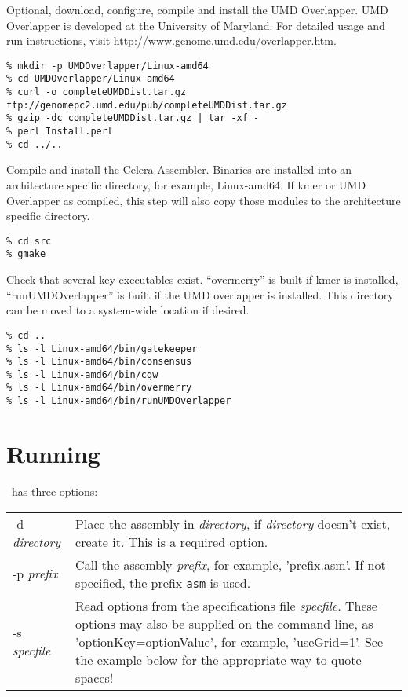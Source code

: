 \documentclass[twoside,11pt]{article}
\begin{document}
Optional, download, configure, compile and install the UMD Overlapper.  UMD Overlapper is developed at the University of Maryland. For detailed usage and run instructions, visit http://www.genome.umd.edu/overlapper.htm.

\begin{verbatim}
% mkdir -p UMDOverlapper/Linux-amd64
% cd UMDOverlapper/Linux-amd64
% curl -o completeUMDDist.tar.gz ftp://genomepc2.umd.edu/pub/completeUMDDist.tar.gz
% gzip -dc completeUMDDist.tar.gz | tar -xf -
% perl Install.perl
% cd ../..
\end{verbatim}

Compile and install the Celera Assembler.  Binaries are installed into
an architecture specific directory, for example, Linux-amd64.  If kmer
or UMD Overlapper as compiled, this step will also copy those modules
to the architecture specific directory.

\begin{verbatim}
% cd src
% gmake
\end{verbatim}

Check that several key executables exist.  ``overmerry'' is built if
kmer is installed, ``runUMDOverlapper'' is built if the UMD overlapper
is installed.  This directory can be moved to a system-wide location
if desired.

\begin{verbatim}
% cd ..
% ls -l Linux-amd64/bin/gatekeeper
% ls -l Linux-amd64/bin/consensus
% ls -l Linux-amd64/bin/cgw
% ls -l Linux-amd64/bin/overmerry
% ls -l Linux-amd64/bin/runUMDOverlapper
\end{verbatim}

\section{Running}

\runCA\ has three options:

\begin{longtable}{lp{3.0in}}
-d {\it directory} &
Place the assembly in {\it directory}, if {\it directory} doesn't exist,
create it.  This is a required option.
\\
-p {\it prefix} &
Call the assembly {\it prefix}, for example, 'prefix.asm'.  If not
specified, the prefix {\tt asm} is used.
\\
-s {\it specfile} &
Read options from the specifications file {\it specfile}.  These
options may also be supplied on the command line, as
'optionKey=optionValue', for example, 'useGrid=1'.  See the example
below for the appropriate way to quote spaces!
\end{longtable}
\end{document}
